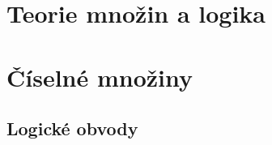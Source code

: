\documentclass[
  12pt, %
  fleqn, %
  a4paper, %
]{LegrandOrangeBook}
\begin{document}


\pagestyle{fancy} %

\cleardoublepage

\chapterspaceabove{2cm} %
\chapterspacebelow{2cm} %

\part{Teorie množin a logika}


\part{Číselné množiny}


\stopcontents[part] %
\makeatletter\@dotoc@ppfalse\makeatother %
\cleardoublepage{}
{}

\begin{appendices}
  \renewcommand{\chaptername}{Appendix}
  \chapter{Logické obvody}
  
\end{appendices}
\end{document}
